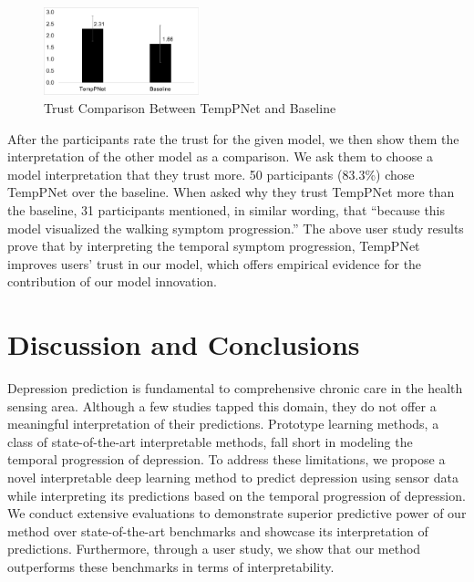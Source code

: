 \documentclass[mnsc]{informs3b} %
\begin{document}
\begin{figure}[h]
    \centering
    \includegraphics[width=0.4\textwidth]{imgs/user-study-trust.pdf}
    \caption{Trust Comparison Between TempPNet and Baseline}
    \label{fig:user-study-trust}
\end{figure}

After the participants rate the trust for the given model, we then show them the interpretation of the other model as a comparison. We ask them to choose a model interpretation that they trust more. 50 participants (83.3\%) chose TempPNet over the baseline. When asked why they trust TempPNet more than the baseline, 31 participants mentioned, in similar wording, that ``because this model visualized the walking symptom progression.'' The above user study results prove that by interpreting the temporal symptom progression, TempPNet improves users' trust in our model, which offers empirical evidence for the contribution of our model innovation.

\section{Discussion and Conclusions} \label{sec:discuss}

Depression prediction is fundamental to comprehensive chronic care in the health sensing area. Although a few studies tapped this domain, they do not offer a meaningful interpretation of their predictions. Prototype learning methods, a class of state-of-the-art interpretable methods, fall short in modeling the temporal progression of depression. To address these limitations, we propose a novel interpretable deep learning method to predict depression using sensor data while interpreting its predictions based on the temporal progression of depression. We conduct extensive evaluations to demonstrate superior predictive power of our method over state-of-the-art benchmarks and showcase its interpretation of predictions. Furthermore, through a user study, we show that our method outperforms these benchmarks in terms of interpretability. 
\end{document}
